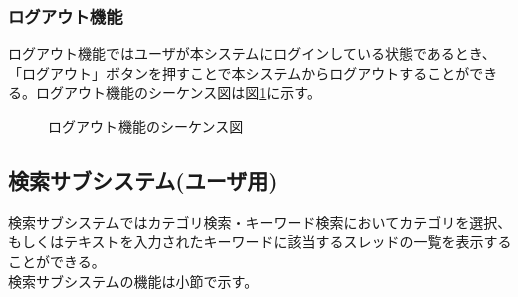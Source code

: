 \documentclass[a4j]{jarticle}
\begin{document}
    \subsubsection{ログアウト機能}
ログアウト機能ではユーザが本システムにログインしている状態であるとき、「ログアウト」ボタンを押すことで本システムからログアウトすることができる。ログアウト機能のシーケンス図は図\ref{fig:login_logout.png}に示す。
    \begin{figure}[H]
\centering
{}
\caption{ログアウト機能のシーケンス図}
\label{fig:login_logout.png}
\end{figure}
\subsection{検索サブシステム(ユーザ用)}
検索サブシステムではカテゴリ検索・キーワード検索においてカテゴリを選択、もしくはテキストを入力されたキーワードに該当するスレッドの一覧を表示することができる。\\
検索サブシステムの機能は小節で示す。
\end{document}

